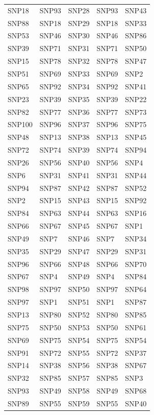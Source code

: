 \begin{table}[ht]
\begin{tabular}{lllll}
  SNP18 & SNP93 & SNP28 & SNP93 & SNP43 \\ 
  SNP88 & SNP18 & SNP29 & SNP18 & SNP33 \\ 
  SNP53 & SNP46 & SNP30 & SNP46 & SNP86 \\ 
  SNP39 & SNP71 & SNP31 & SNP71 & SNP50 \\ 
  SNP15 & SNP78 & SNP32 & SNP78 & SNP47 \\ 
  SNP51 & SNP69 & SNP33 & SNP69 & SNP2 \\ 
  SNP65 & SNP92 & SNP34 & SNP92 & SNP41 \\ 
  SNP23 & SNP39 & SNP35 & SNP39 & SNP22 \\ 
  SNP82 & SNP77 & SNP36 & SNP77 & SNP73 \\ 
  SNP100 & SNP96 & SNP37 & SNP96 & SNP75 \\ 
  SNP48 & SNP13 & SNP38 & SNP13 & SNP45 \\ 
  SNP72 & SNP74 & SNP39 & SNP74 & SNP94 \\ 
  SNP26 & SNP56 & SNP40 & SNP56 & SNP4 \\ 
  SNP6 & SNP31 & SNP41 & SNP31 & SNP44 \\ 
  SNP94 & SNP87 & SNP42 & SNP87 & SNP52 \\ 
  SNP2 & SNP15 & SNP43 & SNP15 & SNP92 \\ 
  SNP84 & SNP63 & SNP44 & SNP63 & SNP16 \\ 
  SNP66 & SNP67 & SNP45 & SNP67 & SNP1 \\ 
  SNP49 & SNP7 & SNP46 & SNP7 & SNP34 \\ 
  SNP35 & SNP29 & SNP47 & SNP29 & SNP31 \\ 
  SNP96 & SNP66 & SNP48 & SNP66 & SNP70 \\ 
  SNP67 & SNP4 & SNP49 & SNP4 & SNP84 \\ 
  SNP98 & SNP97 & SNP50 & SNP97 & SNP64 \\ 
  SNP97 & SNP1 & SNP51 & SNP1 & SNP87 \\ 
  SNP13 & SNP80 & SNP52 & SNP80 & SNP85 \\ 
  SNP75 & SNP50 & SNP53 & SNP50 & SNP61 \\ 
  SNP69 & SNP75 & SNP54 & SNP75 & SNP54 \\ 
  SNP91 & SNP72 & SNP55 & SNP72 & SNP37 \\ 
  SNP14 & SNP38 & SNP56 & SNP38 & SNP67 \\ 
  SNP32 & SNP85 & SNP57 & SNP85 & SNP3 \\ 
  SNP93 & SNP49 & SNP58 & SNP49 & SNP68 \\ 
  SNP89 & SNP55 & SNP59 & SNP55 & SNP40 \\ 

\end{tabular}
\end{table}
